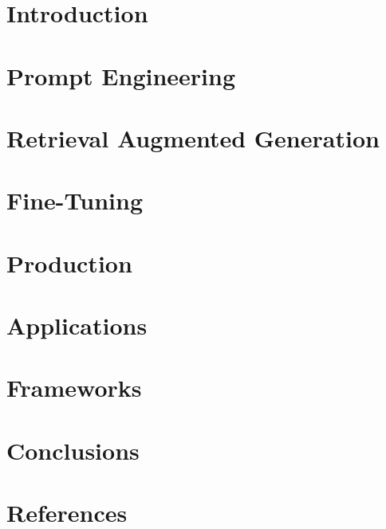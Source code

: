 \section[Intro]{Introduction}






\section[Prompts]{Prompt Engineering}




\section[RAG]{Retrieval Augmented Generation}


\section[FT]{Fine-Tuning}


\section[Prod]{Production}



\section[Apps]{Applications}



\section[Frameworks]{Frameworks}








\section[Concl]{Conclusions}


\section[Refs]{References}


